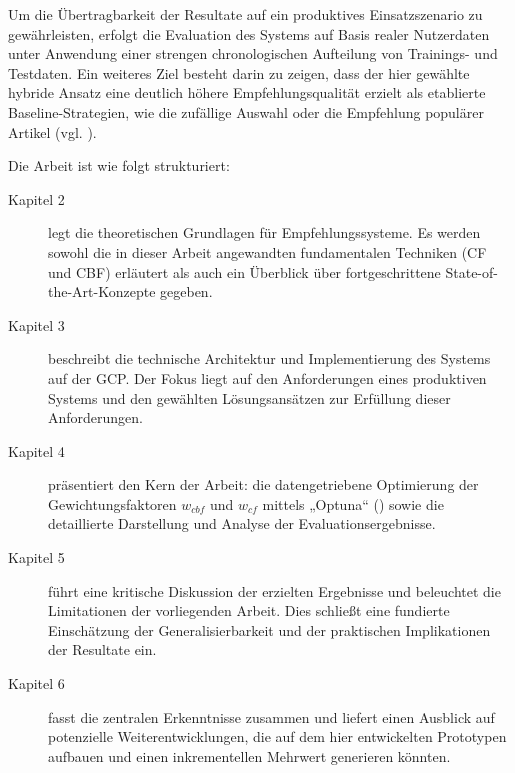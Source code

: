 Um die Übertragbarkeit der Resultate auf ein produktives Einsatzszenario zu gewährleisten, 
erfolgt die Evaluation des Systems auf Basis realer Nutzerdaten unter Anwendung einer strengen 
chronologischen Aufteilung von Trainings- und Testdaten. Ein weiteres Ziel besteht darin zu zeigen, dass der hier gewählte 
hybride Ansatz eine deutlich höhere Empfehlungsqualität 
erzielt als etablierte Baseline-Strategien, wie die zufällige 
Auswahl oder die Empfehlung populärer Artikel (vgl. \cite{wu_personalized_2022}).

Die Arbeit ist wie folgt strukturiert:
\begin{description}
    \item[Kapitel 2] legt die theoretischen Grundlagen für Empfehlungssysteme. Es werden sowohl die in dieser Arbeit angewandten fundamentalen Techniken (CF und CBF) erläutert als auch ein Überblick über fortgeschrittene State-of-the-Art-Konzepte gegeben.
    \item[Kapitel 3] beschreibt die technische Architektur und Implementierung des Systems auf der \ac{GCP}. Der Fokus liegt auf den Anforderungen eines produktiven Systems und den gewählten Lösungsansätzen zur Erfüllung dieser Anforderungen.
    \item[Kapitel 4] präsentiert den Kern der Arbeit: die datengetriebene Optimierung der Gewichtungsfaktoren \(w_{cbf}\) und \(w_{cf}\) mittels „Optuna“ (\cite{Akiba_Optuna_2019}) sowie die detaillierte Darstellung und Analyse der Evaluationsergebnisse.
    \item[Kapitel 5] führt eine kritische Diskussion der erzielten Ergebnisse und beleuchtet die Limitationen der vorliegenden Arbeit. Dies schließt eine fundierte Einschätzung der Generalisierbarkeit und der praktischen Implikationen der Resultate ein.
    \item[Kapitel 6] fasst die zentralen Erkenntnisse zusammen und liefert einen Ausblick auf potenzielle Weiterentwicklungen, die auf dem hier entwickelten Prototypen aufbauen und einen inkrementellen Mehrwert generieren könnten.
\end{description}
